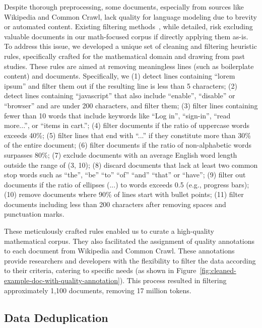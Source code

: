 Despite thorough preprocessing, some documents, especially from sources like Wikipedia and Common Crawl, lack quality for language modeling due to brevity or automated content. Existing filtering methods~\citep{DBLP:journals/jmlr/RaffelSRLNMZLL20-T5,DBLP:journals/corr/abs-2112-11446-gopher,DBLP:journals/corr/abs-2305-13169-a-pretrainer-data-guide,DBLP:journals/corr/abs-2306-01116-refinedweb,SlimPajama}, while detailed, risk excluding valuable documents in our math-focused corpus if directly applying them as-is. To address this issue, we developed a unique set of cleaning and filtering heuristic rules, specifically crafted for the mathematical domain and drawing from past studies. These rules are aimed at removing meaningless lines (such as boilerplate content) and documents. Specifically, we (1)  detect lines containing ``lorem ipsum'' and filter them out if the resulting line is less than 5 characters; (2) detect lines containing ``javascript'' that also include  ``enable'', ``disable'' or ``browser'' and are under 200 characters, and filter them; (3) filter lines containing fewer than 10 words that include keywords like ``Log in'', ``sign-in'', ``read more...'', or ``items in cart.''; (4) filter documents if the ratio of uppercase words exceeds 40\%; (5) filter lines that end with ``...'' if they constitute more than 30\% of the entire document; (6)  filter documents if the ratio of non-alphabetic words surpasses 80\%; (7)  exclude documents with an average English word length outside the range of (3, 10); (8) discard documents that lack at least two common stop words such as ``the'', ``be'' ``to'' ``of'' ``and'' ``that'' or ``have''; (9)  filter out documents if the ratio of ellipses (...) to words exceeds 0.5 (e.g., progress bars); (10)  remove documents where 90\% of lines start with bullet points; (11)  filter documents including less than 200 characters after removing spaces and punctuation marks.

These meticulously crafted rules enabled us to curate a high-quality mathematical corpus. They also facilitated the assignment of quality annotations to each document from Wikipedia and Common Crawl. These annotations provide researchers and developers with the flexibility to filter the data according to their criteria, catering to specific needs (as shown in Figure~\ref{fig:cleaned-example-doc-with-quality-annotation}). This process resulted in filtering approximately 1,100 documents, removing 17 million tokens.

\subsection{Data Deduplication}

